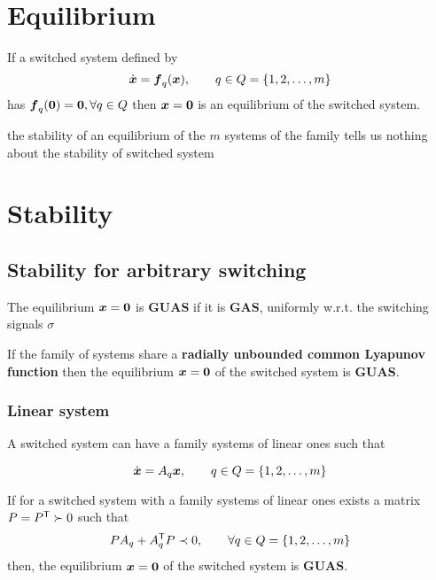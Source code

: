 \section{Equilibrium}

\begin{theorem}\label{thm:switching-}
	If a switched system defined by
	\[
		\dot{\boldsymbol{x}} = \boldsymbol{f}_q(\boldsymbol{x}), \qquad q \in Q = \{1,2,\dots,m\}
	\]
	has $\boldsymbol{f}_q(\boldsymbol{0}) = \boldsymbol{0}, \forall q \in Q$ then $\boldsymbol{x} = \boldsymbol{0}$ is an equilibrium of the switched system.
\end{theorem}

\begin{nb}the stability of an equilibrium of the $m$ systems of the family tells us nothing about the stability of switched system\end{nb}

\section{Stability}

\subsection{Stability for arbitrary switching}\label{subsec:switching-stability-arbitrary}

\begin{definition}
	The equilibrium $\boldsymbol{x}=\boldsymbol{0}$ is \textbf{GUAS} if it is \textbf{GAS}, uniformly w.r.t. the switching signals $\sigma$
\end{definition}

\begin{theorem}
	If the family of systems share a \textbf{radially unbounded common Lyapunov function} then the equilibrium $\boldsymbol{x}=\boldsymbol{0}$ of the switched system is \textbf{GUAS}.
\end{theorem}

\subsubsection{Linear system}

A switched system can have a family systems of linear ones such that

\[
	\dot{\boldsymbol{x}} = A_q \boldsymbol{x}, \qquad q \in Q = \{1,2,\dots,m\}
\]

\begin{theorem}\label{thm:switching-stability-linear-common}
	If for a switched system with a family systems of linear ones exists a matrix $P = P^{\mathsf{T}} \succ 0$ such that
	\[
		PA_q + A_q^{\mathsf{T}} P \prec 0, \qquad \forall q \in Q = \{1,2,\dots,m\}
	\]
	then, the equilibrium $\boldsymbol{x}=\boldsymbol{0}$ of the switched system is \textbf{GUAS}.
\end{theorem}


